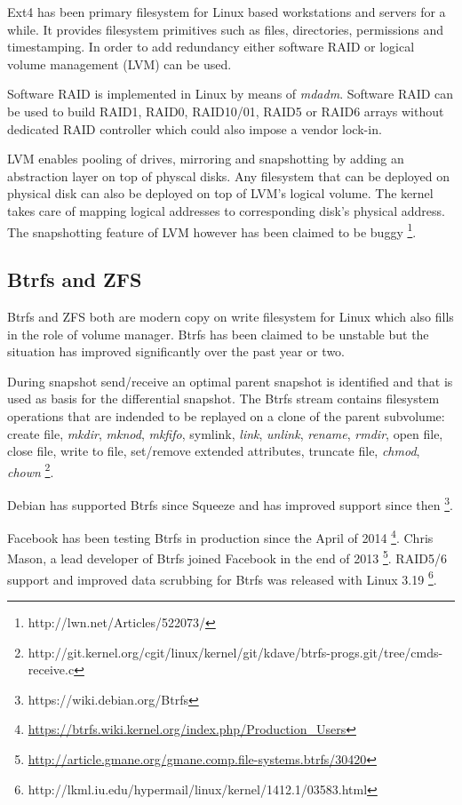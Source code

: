 \documentclass{article}
\begin{document}
Ext4 has been primary filesystem for Linux based workstations and servers for
a while. It provides filesystem primitives such as files, directories,
permissions and timestamping. In order to add redundancy either software RAID
or logical volume management (LVM) can be used.

Software RAID is implemented in Linux by means of \emph{mdadm}. Software RAID
can be used to build RAID1, RAID0, RAID10/01, RAID5 or RAID6 arrays without
dedicated RAID controller which could also impose a vendor lock-in.

LVM enables pooling of drives, mirroring and snapshotting by adding an
abstraction layer on top of physcal disks. Any filesystem that can be deployed
on physical disk can also be deployed on top of LVM's logical volume. The
kernel takes care of mapping logical addresses to corresponding disk's physical
address. The snapshotting feature of LVM however has been claimed to be buggy
\footnote{http://lwn.net/Articles/522073/}.

\subsection{Btrfs and ZFS}

Btrfs and ZFS both are modern copy on write filesystem for Linux which also
fills in the role of volume manager. Btrfs has been claimed to be unstable but
the situation has improved significantly over the past year or two. 

During snapshot send/receive an optimal parent snapshot is identified and that
is used as basis for the differential snapshot. The Btrfs stream contains
filesystem operations that are indended to be replayed on a clone of the
parent subvolume: create file, \emph{mkdir}, \emph{mknod}, \emph{mkfifo},
symlink, \emph{link}, \emph{unlink}, \emph{rename}, \emph{rmdir}, open file,
close file, write to file, set/remove extended attributes, truncate file,
\emph{chmod}, \emph{chown}
\footnote{http://git.kernel.org/cgit/linux/kernel/git/kdave/btrfs-progs.git/tree/cmds-receive.c}.

Debian has supported Btrfs since Squeeze and has improved support since then
\footnote{https://wiki.debian.org/Btrfs}.  

Facebook has been testing Btrfs in production since the April of 2014
\footnote{\url{https://btrfs.wiki.kernel.org/index.php/Production_Users}}.
Chris Mason, a lead developer of Btrfs joined Facebook in the end of 2013
\footnote{\url{http://article.gmane.org/gmane.comp.file-systems.btrfs/30420}}.
RAID5/6 support and improved data scrubbing for Btrfs was released with Linux
3.19 \footnote{http://lkml.iu.edu/hypermail/linux/kernel/1412.1/03583.html}.
\end{document}
